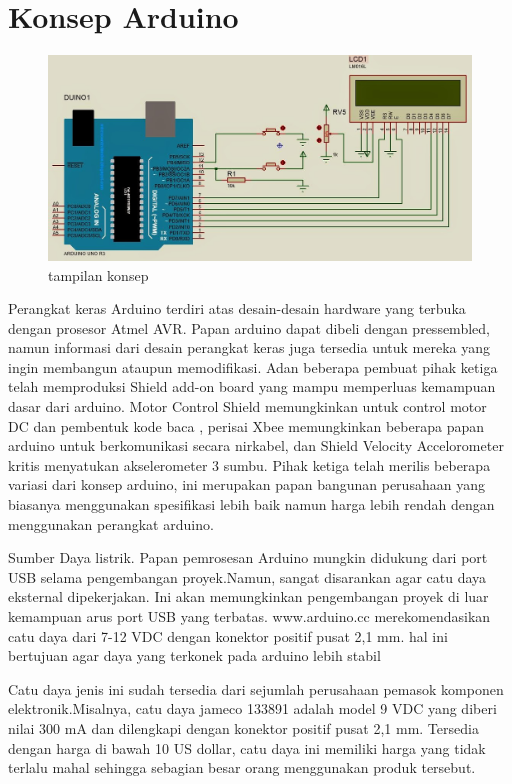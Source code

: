 \section{ Konsep Arduino}
\begin{figure}[ht]
	\centerline{\includegraphics[width=1\textwidth]{figures/konsep.JPG}}
	\caption{tampilan konsep}
	\label{konsep}
	\end{figure}
 	Perangkat keras Arduino terdiri atas desain-desain hardware yang terbuka dengan prosesor Atmel AVR. Papan arduino dapat dibeli dengan pressembled, namun informasi dari desain perangkat keras juga tersedia untuk mereka yang ingin membangun ataupun memodifikasi. Adan beberapa pembuat pihak ketiga telah memproduksi Shield add-on board yang mampu memperluas kemampuan dasar dari arduino. Motor Control Shield memungkinkan untuk control motor DC dan pembentuk kode baca , perisai Xbee memungkinkan beberapa papan arduino untuk berkomunikasi secara nirkabel, dan Shield Velocity Accelorometer kritis menyatukan akselerometer 3 sumbu.  Pihak ketiga telah merilis beberapa variasi dari konsep arduino, ini merupakan papan bangunan perusahaan yang biasanya menggunakan spesifikasi lebih baik namun harga lebih rendah dengan menggunakan perangkat arduino.

 	Sumber Daya listrik. Papan pemrosesan Arduino mungkin didukung dari port USB selama pengembangan proyek.Namun, sangat disarankan agar catu daya eksternal dipekerjakan. Ini akan memungkinkan pengembangan proyek di luar kemampuan arus port USB yang terbatas. www.arduino.cc merekomendasikan catu daya dari 7-12 VDC dengan konektor positif pusat 2,1 mm. hal ini bertujuan agar daya yang terkonek pada arduino lebih stabil
 
 	Catu daya jenis ini sudah tersedia dari sejumlah perusahaan pemasok komponen elektronik.Misalnya, catu daya jameco 133891 adalah model 9 VDC yang diberi nilai 300 mA dan dilengkapi dengan konektor positif pusat 2,1 mm. Tersedia dengan harga di bawah 10 US dollar, catu daya ini memiliki harga yang tidak terlalu mahal sehingga sebagian besar orang menggunakan produk tersebut.

